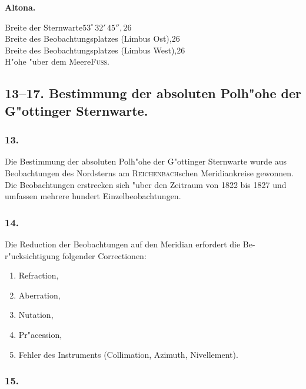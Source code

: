 \documentclass[12pt,a4paper]{article}
\theoremstyle{plain}
\theoremstyle{definition}
\theoremstyle{remark}
\begin{document}
\vspace{0.3cm}
\noindent
\textbf{Altona.}

\medskip
\noindent
Breite der Sternwarte\dotfill $53^\circ\,32'\,45''{,}26$ \\
Breite des Beobachtungsplatzes (Limbus Ost),26 \\
Breite des Beobachtungsplatzes (Limbus West),26 \\
H"ohe "uber dem Meere\quad\textsc{Fuss.}

\newpage
\subsection*{13--17. Bestimmung der absoluten Polh"ohe der G"ottinger Sternwarte.}

\subsubsection*{13.}

Die Bestimmung der absoluten Polh"ohe der G"ottinger Sternwarte wurde
aus Beobachtungen des Nordsterns am \textsc{Reichenbach}schen Meridiankreise
gewonnen. Die Beobachtungen erstrecken sich "uber den Zeitraum von
1822 bis 1827 und umfassen mehrere hundert Einzelbeobachtungen.

\subsubsection*{14.}

Die Reduction der Beobachtungen auf den Meridian erfordert die Be-
r"ucksichtigung folgender Correctionen:
\begin{enumerate}[nosep]
\item Refraction,
\item Aberration,
\item Nutation,
\item Pr"acession,
\item Fehler des Instruments (Collimation, Azimuth, Nivellement).
\end{enumerate}

\subsubsection*{15.}
\end{document}
